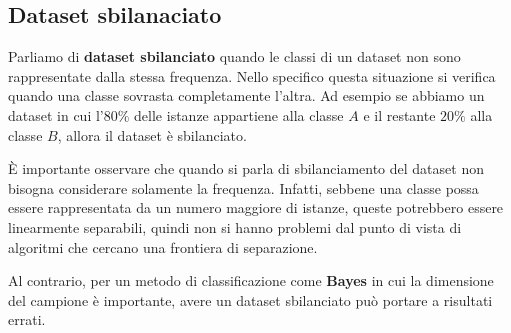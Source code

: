 \subsection{Dataset sbilanaciato}
Parliamo di \textbf{dataset sbilanciato} quando le classi di un dataset non sono
rappresentate dalla stessa frequenza. Nello specifico questa situazione si
verifica quando una classe sovrasta completamente l'altra. Ad esempio se abbiamo
un dataset in cui l'$80\%$ delle istanze appartiene alla classe $A$ e il restante
$20\%$ alla classe $B$, allora il dataset è sbilanciato.

È importante osservare che quando si parla di sbilanciamento del dataset
non bisogna considerare solamente la frequenza. Infatti, sebbene una classe
possa essere rappresentata da un numero maggiore di istanze, queste potrebbero
essere linearmente separabili, quindi non si hanno problemi dal punto di vista
di algoritmi che cercano una frontiera di separazione.

Al contrario, per un metodo di classificazione come \textbf{Bayes} in cui la
dimensione del campione è importante, avere un dataset sbilanciato può portare
a risultati errati.

